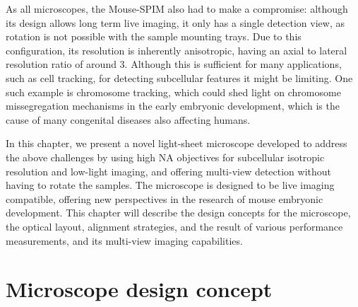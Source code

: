 As all microscopes, the Mouse-SPIM also had to make a compromise: although its design allows long term live imaging, it only has a single detection view, as rotation is not possible with the sample mounting trays. Due to this configuration, its resolution is inherently anisotropic, having an axial to lateral resolution ratio of around 3. Although this is sufficient for many applications, such as cell tracking, for detecting subcellular features it might be limiting. One such example is chromosome tracking, which could shed light on chromosome missegregation mechanisms in the early embryonic development, which is the cause of many congenital diseases also affecting humans.

In this chapter, we present a novel light-sheet microscope developed to address the above challenges by using high NA objectives for subcellular isotropic resolution and low-light imaging, and offering multi-view detection without having to rotate the samples. The microscope is designed to be live imaging compatible, offering new perspectives in the research of mouse embryonic development. This chapter will describe the design concepts for the microscope, the optical layout, alignment strategies, and the result of various performance measurements, and its multi-view imaging capabilities. 


\section{Microscope design concept}
\label{sec:120concept}

